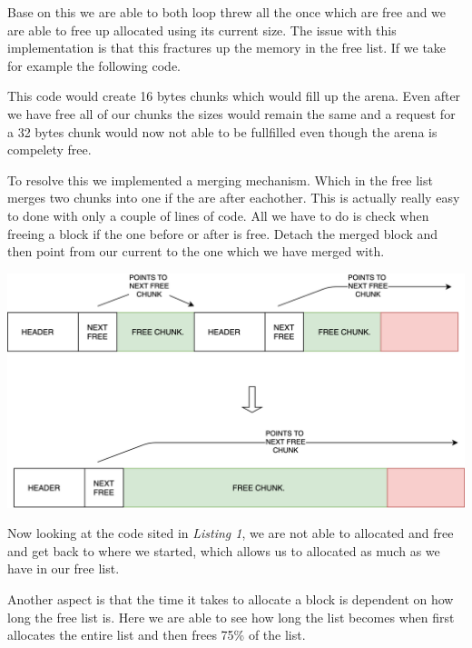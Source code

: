 \documentclass{article}
\begin{document}
Base on this we are able to both loop threw all the once which are free and we are able to free up allocated using its current size. The issue with this implementation is that this fractures up the memory in the free list. If we take for example the following code.





This code would create 16 bytes chunks which would fill up the arena. Even after we have free all of our chunks the sizes would remain the same and a request for a 32 bytes chunk would now not able to be fullfilled even though the arena is compelety free.



To resolve this we implemented a merging mechanism. Which in the free list merges two chunks into one if the are after eachother. This is actually really easy to done with only a couple of lines of code. All we have to do is check when freeing a block if the one before or after is free. Detach the merged block and then point from our current to the one which we have merged with. \newline

\begin{center}
    \includegraphics[scale=0.12]{images/merging-example.png}
\end{center}
     

Now looking at the code sited in \emph{Listing 1}, we are not able to allocated and free and get back to where we started, which allows us to allocated as much as we have in our free list.

Another aspect is that the time it takes to allocate a block is dependent on how long the free list is. Here we are able to see how long the list becomes when first allocates the entire list and then frees 75\% of the list.
\end{document}

